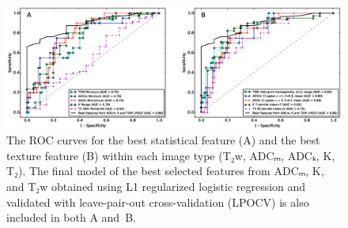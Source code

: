 \begin{figure}[ht]

\centering \includegraphics[width=1.0\textwidth]{figures/fig4}

\caption{The ROC curves for the best statistical feature (A) and the best
texture feature (B) within each image type (T₂w, ADCₘ, ADCₖ, K, T₂). The final
model of the best selected features from ADCₘ, K, and T₂w obtained using L1
regularized logistic regression and validated with leave-pair-out
cross-validation (LPOCV) is also included in both A and~B.}\label{fig:roc}

\end{figure}
